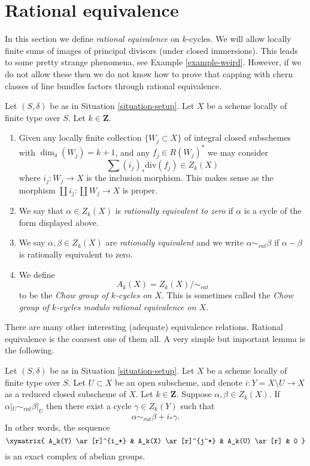 \section{Rational equivalence}
\label{section-rational-equivalence}

\noindent
In this section we define {\it rational equivalence} on $k$-cycles.
We will allow locally finite sums of images of
principal divisors (under closed immersions). This leads to some
pretty strange phenomena, see Example \ref{example-weird}.
However, if we do not allow these then we do not know how to prove that
capping with chern classes of line bundles factors through rational
equivalence.

\begin{definition}
\label{definition-rational-equivalence}
Let $(S, \delta)$ be as in Situation \ref{situation-setup}.
Let $X$ be a scheme locally of finite type over $S$.
Let $k \in \mathbf{Z}$.
\begin{enumerate}
\item Given any locally finite collection $\{W_j \subset X\}$
of integral closed subschemes with $\dim_\delta(W_j) = k + 1$,
and any $f_j \in R(W_j)^*$ we may consider
$$
\sum (i_j)_*\text{div}(f_j) \in Z_k(X)
$$
where $i_j : W_j \to X$ is the inclusion morphism.
This makes sense as the morphism
$\coprod i_j : \coprod W_j \to X$ is proper.
\item We say that $\alpha \in Z_k(X)$ is {\it rationally equivalent to zero}
if $\alpha$ is a cycle of the form displayed above.
\item We say $\alpha, \beta \in Z_k(X)$ are
{\it rationally equivalent} and we write $\alpha \sim_{rat} \beta$
if $\alpha - \beta$ is rationally equivalent to zero.
\item We define
$$
A_k(X) = Z_k(X) / \sim_{rat}
$$
to be the {\it Chow group of $k$-cycles on $X$}. This is sometimes called
the {\it Chow group of $k$-cycles modulo rational equivalence on $X$}.
\end{enumerate}
\end{definition}

\noindent
There are many other interesting (adequate) equivalence relations.
Rational equivalence is the coarsest one of them all.
A very simple but important lemma is the following.

\begin{lemma}
\label{lemma-restrict-to-open}
Let $(S, \delta)$ be as in Situation \ref{situation-setup}.
Let $X$ be a scheme locally of finite type over $S$.
Let $U \subset X$ be an open subscheme, and denote
$i : Y = X \setminus U \to X$ as a reduced closed subscheme of $X$.
Let $k \in \mathbf{Z}$.
Suppose $\alpha, \beta \in Z_k(X)$.
If $\alpha|_U \sim_{rat} \beta|_U$ then there exist a cycle
$\gamma \in Z_k(Y)$ such that
$$
\alpha \sim_{rat} \beta + i_*\gamma.
$$
In other words, the sequence
$$
\xymatrix{
A_k(Y) \ar[r]^{i_*} & A_k(X) \ar[r]^{j^*} & A_k(U) \ar[r] & 0
}
$$
is an exact complex of abelian groups.
\end{lemma}

